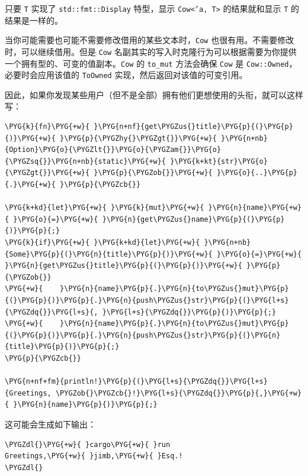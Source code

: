 只要 \texttt{T} 实现了 \texttt{std::fmt::Display} 特型，显示 \texttt{Cow<'a, T>} 的结果就和显示 \texttt{T} 的结果是一样的。

当你可能需要也可能不需要修改借用的某些文本时，\texttt{Cow} 也很有用。不需要修改时，可以继续借用。但是 \texttt{Cow} 名副其实的写入时克隆行为可以根据需要为你提供一个拥有型的、可变的值副本。\texttt{Cow} 的 \texttt{to\_mut} 方法会确保 \texttt{Cow} 是 \texttt{Cow::Owned}，必要时会应用该值的 \texttt{ToOwned} 实现，然后返回对该值的可变引用。

因此，如果你发现某些用户（但不是全部）拥有他们更想使用的头衔，就可以这样写：

\begin{Verbatim}[commandchars=\\\{\},breaklines=true,breakanywhere=true,fontsize=\codefont,xleftmargin=17bp]
\PYG{k}{fn}\PYG{+w}{ }\PYG{n+nf}{get\PYGZus{}title}\PYG{p}{(}\PYG{p}{)}\PYG{+w}{ }\PYG{p}{\PYGZhy{}\PYGZgt{}}\PYG{+w}{ }\PYG{n+nb}{Option}\PYG{o}{\PYGZlt{}}\PYG{o}{\PYGZam{}}\PYG{o}{\PYGZsq{}}\PYG{n+nb}{static}\PYG{+w}{ }\PYG{k+kt}{str}\PYG{o}{\PYGZgt{}}\PYG{+w}{ }\PYG{p}{\PYGZob{}}\PYG{+w}{ }\PYG{o}{..}\PYG{p}{.}\PYG{+w}{ }\PYG{p}{\PYGZcb{}}

\PYG{k+kd}{let}\PYG{+w}{ }\PYG{k}{mut}\PYG{+w}{ }\PYG{n}{name}\PYG{+w}{ }\PYG{o}{=}\PYG{+w}{ }\PYG{n}{get\PYGZus{}name}\PYG{p}{(}\PYG{p}{)}\PYG{p}{;}
\PYG{k}{if}\PYG{+w}{ }\PYG{k+kd}{let}\PYG{+w}{ }\PYG{n+nb}{Some}\PYG{p}{(}\PYG{n}{title}\PYG{p}{)}\PYG{+w}{ }\PYG{o}{=}\PYG{+w}{ }\PYG{n}{get\PYGZus{}title}\PYG{p}{(}\PYG{p}{)}\PYG{+w}{ }\PYG{p}{\PYGZob{}}
\PYG{+w}{    }\PYG{n}{name}\PYG{p}{.}\PYG{n}{to\PYGZus{}mut}\PYG{p}{(}\PYG{p}{)}\PYG{p}{.}\PYG{n}{push\PYGZus{}str}\PYG{p}{(}\PYG{l+s}{\PYGZdq{}}\PYG{l+s}{, }\PYG{l+s}{\PYGZdq{}}\PYG{p}{)}\PYG{p}{;}
\PYG{+w}{    }\PYG{n}{name}\PYG{p}{.}\PYG{n}{to\PYGZus{}mut}\PYG{p}{(}\PYG{p}{)}\PYG{p}{.}\PYG{n}{push\PYGZus{}str}\PYG{p}{(}\PYG{n}{title}\PYG{p}{)}\PYG{p}{;}
\PYG{p}{\PYGZcb{}}

\PYG{n+nf+fm}{println!}\PYG{p}{(}\PYG{l+s}{\PYGZdq{}}\PYG{l+s}{Greetings, \PYGZob{}\PYGZcb{}!}\PYG{l+s}{\PYGZdq{}}\PYG{p}{,}\PYG{+w}{ }\PYG{n}{name}\PYG{p}{)}\PYG{p}{;}
\end{Verbatim}

这可能会生成如下输出：

\begin{Verbatim}[commandchars=\\\{\},breaklines=true,breakanywhere=true,fontsize=\codefont,xleftmargin=17bp]
\PYGZdl{}\PYG{+w}{ }cargo\PYG{+w}{ }run
Greetings,\PYG{+w}{ }jimb,\PYG{+w}{ }Esq.!
\PYGZdl{}
\end{Verbatim}


